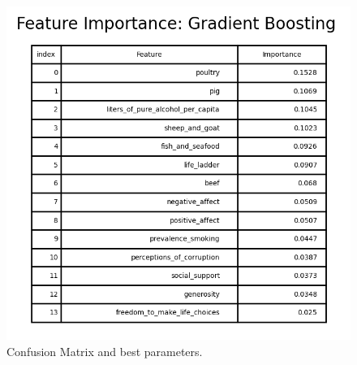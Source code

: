                 \begin{figure}[H]
                        \centering
                        \includegraphics[scale=1]{images/dm_featu_imp_grad_boost}
                        \caption{Confusion Matrix and best parameters.}
                        \label{fig:dm-gradient-boosting-bp}
                \end{figure}

